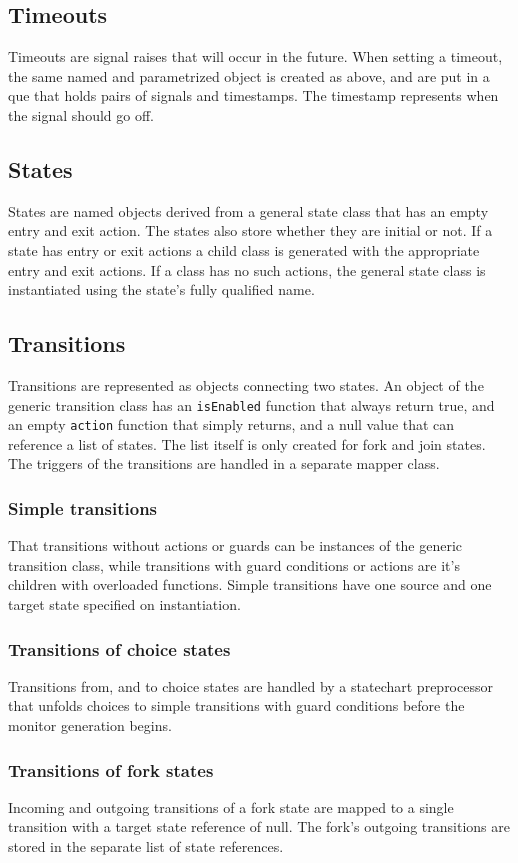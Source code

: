 {  \subsection{Timeouts}
Timeouts are signal raises that will occur in the future. When setting a timeout, the same named and parametrized object is created as above, and are put in a que that holds pairs of signals and timestamps. The timestamp represents when the signal should go off.
  \subsection{States}
States are named objects derived from a general state class that has an empty entry and exit action. The states also store whether they are initial or not. If a state has entry or exit actions a child class is generated with the appropriate entry and exit actions. If a class has no such actions, the general state class is instantiated using the state's fully qualified name.
  \subsection{Transitions}
Transitions are represented as objects connecting two states. An object of the generic transition class has an \verb!isEnabled! function that always return true, and an empty \verb!action! function that simply returns, and a null value that can reference a list of states. The list itself is only created for fork and join states. The triggers of the transitions are handled in a separate mapper class.
    \subsubsection{Simple transitions}
That transitions without actions or guards can be instances of the generic transition class, while transitions with guard conditions or actions are it's children with overloaded functions. Simple transitions have one source and one 
target state specified on instantiation.
    \subsubsection{Transitions of choice states}
Transitions from, and to choice states are handled by a statechart preprocessor that unfolds choices to simple transitions with guard conditions before the monitor generation begins.
    \subsubsection{Transitions of fork states}
Incoming and outgoing transitions of a fork state are mapped to a single transition with a target state reference of null. The fork's outgoing transitions are stored in the separate list of state references.
}
